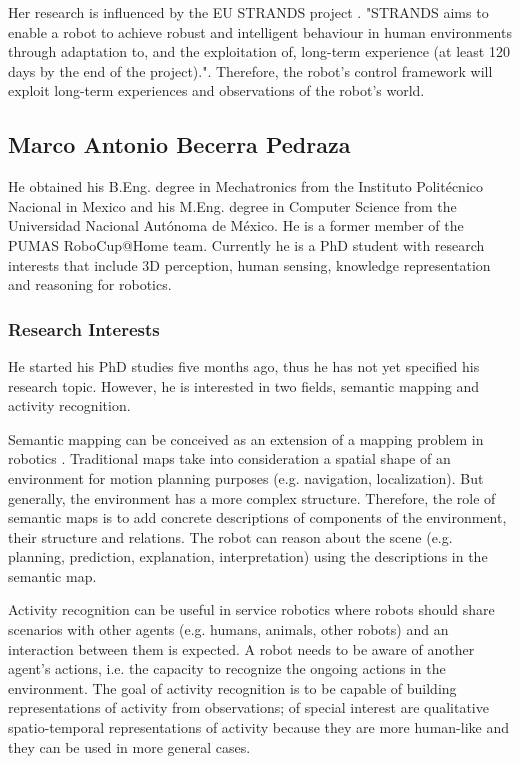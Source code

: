 \documentclass[conference]{IEEEtran}
\begin{document}
Her research is influenced %
 by the EU STRANDS project \cite{strands}. "STRANDS aims to enable a robot to achieve robust and intelligent behaviour in human environments through adaptation to, and the exploitation of, long-term experience (at least 120 days by the end of the project).". Therefore, the robot's control framework will exploit long-term experiences and observations of the robot's world. 

\subsection{Marco Antonio Becerra Pedraza}

He obtained his B.Eng. degree in Mechatronics from the Instituto Politécnico Nacional in Mexico and his M.Eng. degree in Computer Science from the Universidad Nacional Autónoma de México. He is a former member of the PUMAS RoboCup@Home team. Currently he is a PhD student with research interests that include 3D perception, human sensing, knowledge representation and reasoning for robotics.

\subsubsection*{Research Interests}

He started his PhD studies five months ago, thus he has not yet specified his research topic. However, he is interested in two fields, semantic mapping and activity recognition.

Semantic mapping can be conceived as an extension of a mapping problem in robotics \cite{Nuchter08_TowardsSemanticMaps}. Traditional maps take into consideration a spatial shape of an environment for motion planning purposes (e.g. navigation, localization). But generally, the environment has a more complex structure. Therefore, the role of semantic maps is to add concrete descriptions of components of the environment, their structure and relations. The robot can reason about the scene (e.g. planning, prediction, explanation, interpretation) using the descriptions in the semantic map.

Activity recognition can be useful in service robotics where robots should share scenarios %
with other agents (e.g. humans, animals, other robots) and an interaction between them is expected. A robot needs to be aware of another agent's actions, i.e. the capacity to recognize the ongoing actions in the environment. The goal of activity recognition is to be capable of building representations of activity from observations; of special interest are qualitative spatio-temporal representations of activity because they are more human-like and they can be used in more general cases.
\end{document}

